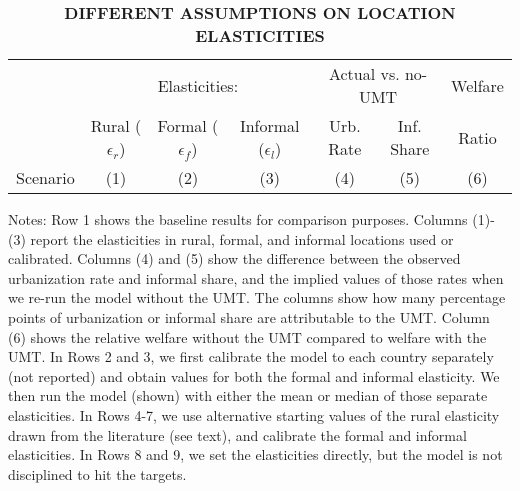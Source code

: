 \documentclass[10pt]{article}
\begin{document}
\begin{table}[htb]
\begin{center}
\begin{footnotesize}
\caption{\textbf{DIFFERENT ASSUMPTIONS ON LOCATION ELASTICITIES}} \label{tab_elasticity}
\begin{tabular}{lcccccc}
\midrule
         & \multicolumn{3}{c}{Elasticities:} & \multicolumn{2}{c}{Actual vs. no-UMT} &Welfare \\ \cmidrule(lr){2-4} \cmidrule(lr){5-6} 
         & Rural ($\epsilon_r$) & Formal ($\epsilon_f$) & Informal ($\epsilon_l$) & Urb. Rate & Inf. Share & Ratio \\ 
Scenario & (1)  & (2) & (3) & (4) & (5) & (6) \\ \midrule

\midrule
\end{tabular}
\end{footnotesize}
\end{center}
Notes: Row 1 shows the baseline results for comparison purposes. Columns (1)-(3) report the elasticities in rural, formal, and informal locations used or calibrated. Columns (4) and (5) show the difference between the observed urbanization rate and informal share, and the implied values of those rates when we re-run the model without the UMT. The columns show how many percentage points of urbanization or informal share are attributable to the UMT. Column (6) shows the relative welfare without the UMT compared to welfare with the UMT. In Rows 2 and 3, we first calibrate the model to each country separately (not reported) and obtain values for both the formal and informal elasticity. We then run the model (shown) with either the mean or median of those separate elasticities. In Rows 4-7, we use alternative starting values of the rural elasticity drawn from the literature (see text), and calibrate the formal and informal elasticities. In Rows 8 and 9, we set the elasticities directly, but the model is not disciplined to hit the targets. 
\end{table}
\end{document}
